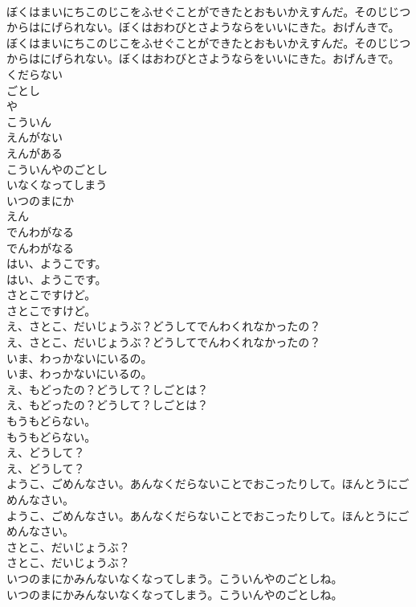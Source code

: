 \documentclass[8pt]{extreport}
\begin{document}
\begin{CJK}{UTF8}{min}
\\	ぼくはまいにちこのじこをふせぐことができたとおもいかえすんだ。そのじじつからはにげられない。ぼくはおわびとさようならをいいにきた。おげんきで。	
\\	ぼくはまいにちこのじこをふせぐことができたとおもいかえすんだ。そのじじつからはにげられない。ぼくはおわびとさようならをいいにきた。おげんきで。 
\\	くだらない
\\	ごとし
\\	や
\\	こういん
\\	えんがない
\\	えんがある
\\	こういんやのごとし
\\	いなくなってしまう
\\	いつのまにか
\\	えん
\\	でんわがなる	
\\	でんわがなる 
\\	はい、ようこです。	
\\	はい、ようこです。 
\\	さとこですけど。	
\\	さとこですけど。 
\\	え、さとこ、だいじょうぶ？どうしてでんわくれなかったの？	
\\	え、さとこ、だいじょうぶ？どうしてでんわくれなかったの？ 
\\	いま、わっかないにいるの。	
\\	いま、わっかないにいるの。 
\\	え、もどったの？どうして？しごとは？	
\\	え、もどったの？どうして？しごとは？ 
\\	もうもどらない。	
\\	もうもどらない。 
\\	え、どうして？	
\\	え、どうして？ 
\\	ようこ、ごめんなさい。あんなくだらないことでおこったりして。ほんとうにごめんなさい。	
\\	ようこ、ごめんなさい。あんなくだらないことでおこったりして。ほんとうにごめんなさい。 
\\	さとこ、だいじょうぶ？	
\\	さとこ、だいじょうぶ？ 
\\	いつのまにかみんないなくなってしまう。こういんやのごとしね。	
\\	いつのまにかみんないなくなってしまう。こういんやのごとしね。 

\end{CJK}
\end{document}
